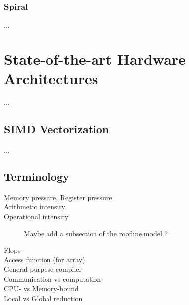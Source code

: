 \subsubsection{Spiral}
...

\section{State-of-the-art Hardware Architectures}
\label{sec:bkg:arch}
...

\subsection{SIMD Vectorization}
...

\subsection{Terminology}
\label{sec:bkg:terminology}

\begin{description}
\item[Memory pressure, Register pressure]
\item[Arithmetic intensity]
\item[Operational intensity] Maybe add a subsection of the roofline model ?
\item[Flops]
\item[Access function (for array)]
\item[General-purpose compiler]
\item[Communication vs computation]
\item[CPU- vs Memory-bound]
\item[Local vs Global reduction]
\end{description}
